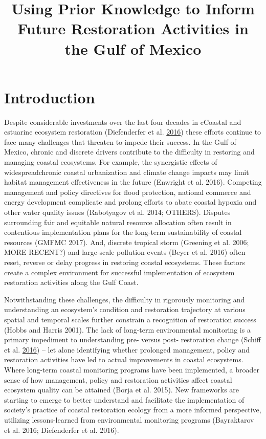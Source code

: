 \documentclass[]{article}
\title{Using Prior Knowledge to Inform Future Restoration Activities in the
Gulf of Mexico}
\author{}
\date{}
\begin{document}
\maketitle

\section{Introduction}\label{introduction}

Despite considerable investments over the last four decades in cCoastal
and estuarine ecosystem restoration (Diefenderfer et al.
\protect\hyperlink{ref-Diefenderfer16}{2016}) these efforts continue to
face many challenges that threaten to impede their success. In the Gulf
of Mexico, chronic and discrete drivers contribute to the difficulty in
restoring and managing coastal ecosystems. For example, the synergistic
effects of widespreadchronic coastal urbanization and climate change
impacts may limit habitat management effectiveness in the future
(Enwright et al. 2016). Competing management and policy directives for
flood protection, national commerce and energy development complicate
and prolong efforts to abate coastal hypoxia and other water quality
issues (Rabotyagov et al. 2014; OTHERS). Disputes surrounding fair and
equitable natural resource allocation often result in contentious
implementation plans for the long-term sustainability of coastal
resources (GMFMC 2017). And, discrete tropical storm (Greening et al.
2006; MORE RECENT?) and large-scale pollution events (Beyer et al. 2016)
often reset, reverse or delay progress in restoring coastal ecosystems.
These factors create a complex environment for successful implementation
of ecosystem restoration activities along the Gulf Coast.

Notwithstanding these challenges, the difficulty in rigorously
monitoring and understanding an ecosystem's condition and restoration
trajectory at various spatial and temporal scales further constrain a
recognition of restoration success (Hobbs and Harris 2001). The lack of
long-term environmental monitoring is a primary impediment to
understanding pre- versus post- restoration change (Schiff et al.
\protect\hyperlink{ref-Schiff16}{2016}) -- let alone identifying whether
prolonged management, policy and restoration activities have led to
actual improvements in coastal ecosystems. Where long-term coastal
monitoring programs have been implemented, a broader sense of how
management, policy and restoration activities affect coastal ecosystem
quality can be attained (Borja et al. 2015). New frameworks are starting
to emerge to better understand and facilitate the implementation of
society's practice of coastal restoration ecology from a more informed
perspective, utilizing lessons-learned from environmental monitoring
programs (Bayraktarov et al. 2016; Diefenderfer et al. 2016).
\end{document}
